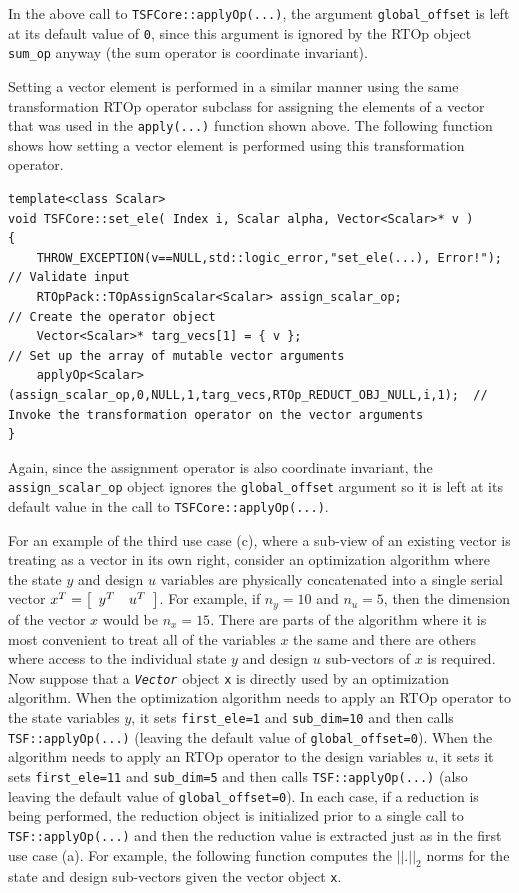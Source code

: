 \documentclass[10pt,fleqn]{article}
\begin{document}
In the above call to \texttt{TSFCore::applyOp(...)}, the argument
\texttt{global\_offset} is left at its default value of \texttt{0},
since this argument is ignored by the RTOp object \texttt{sum\_op}
anyway (the sum operator is coordinate invariant).

Setting a vector element is performed in a similar manner using the
same transformation RTOp operator subclass for assigning the elements
of a vector that was used in the \texttt{apply(...)} function shown
above.  The following function shows how setting a vector element
is performed using this transformation operator.

{\scriptsize\begin{verbatim}
template<class Scalar>
void TSFCore::set_ele( Index i, Scalar alpha, Vector<Scalar>* v )
{
    THROW_EXCEPTION(v==NULL,std::logic_error,"set_ele(...), Error!");               // Validate input
    RTOpPack::TOpAssignScalar<Scalar> assign_scalar_op;                             // Create the operator object
    Vector<Scalar>* targ_vecs[1] = { v };                                           // Set up the array of mutable vector arguments
    applyOp<Scalar>(assign_scalar_op,0,NULL,1,targ_vecs,RTOp_REDUCT_OBJ_NULL,i,1);  // Invoke the transformation operator on the vector arguments
}
\end{verbatim}}

Again, since the assignment operator is also coordinate invariant, the
\texttt{assign\_scalar\_op} object ignores the \texttt{global\_offset}
argument so it is left at its default value in the call to
\texttt{TSFCore::applyOp(...)}.

For an example of the third use case (c), where a sub-view of an
existing vector is treating as a vector in its own right, consider an
optimization algorithm where the state $y$ and design $u$ variables
are physically concatenated into a single serial vector $x^T =
{\bmat{cc} y^T & u^T \emat}$.  For example, if $n_y = 10$ and $n_u =
5$, then the dimension of the vector $x$ would be $n_x = 15$.  There
are parts of the algorithm where it is most convenient to treat all of
the variables $x$ the same and there are others where access to the
individual state $y$ and design $u$ sub-vectors of $x$ is required.
Now suppose that a \texttt{\textit{Vector}} object \texttt{x} is
directly used by an optimization algorithm.  When the optimization
algorithm needs to apply an RTOp operator to the state variables $y$, it
sets \texttt{first\_ele=1} and \texttt{sub\_dim=10} and then calls
\texttt{TSF::applyOp(...)} (leaving the default value of
\texttt{global\_offset=0}).  When the algorithm needs to apply an
RTOp operator to the design variables $u$, it sets it sets
\texttt{first\_ele=11} and \texttt{sub\_dim=5} and then calls
\texttt{TSF::applyOp(...)} (also leaving the default value of
\texttt{global\_offset=0}).  In each case, if a reduction is being performed,
the reduction object is initialized prior to a single call to
\texttt{TSF::applyOp(...)} and then the reduction value is extracted
just as in the first use case (a).  For example, the following
function computes the $||.||_2$ norms for the state and design
sub-vectors given the vector object \texttt{x}.
\end{document}

